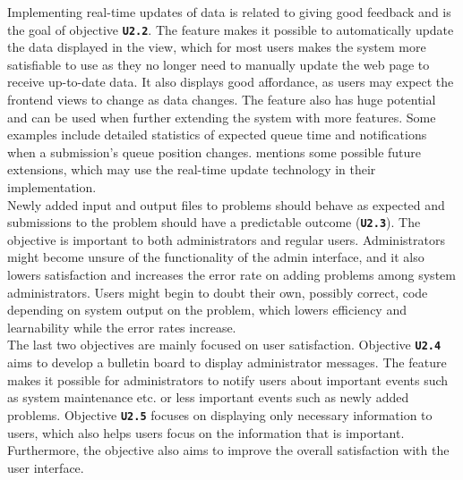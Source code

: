 Implementing real-time updates of data is related to giving good feedback and is the goal of objective \textbf{\texttt{U2.2}}. The feature makes it possible to automatically update the data displayed in the view, which for most users makes the system more satisfiable to use as they no longer need to manually update the web page to receive up-to-date data. It also displays good affordance, as users may expect the frontend views to change as data changes. The feature also has huge potential and can be used when further extending the system with more features. Some examples include detailed statistics of expected queue time and notifications when a submission's queue position changes.  mentions some possible future extensions, which may use the real-time update technology in their implementation. \\

Newly added input and output files to problems should behave as expected and submissions to the problem should have a predictable outcome (\textbf{\texttt{U2.3}}). The objective is important to both administrators and regular users. Administrators might become unsure of the functionality of the admin interface, and it also lowers satisfaction and increases the error rate on adding problems among system administrators. Users might begin to doubt their own, possibly correct, code depending on system output on the problem, which lowers efficiency and learnability while the error rates increase. \\

The last two objectives are mainly focused on user satisfaction. Objective \textbf{\texttt{U2.4}} aims to develop a bulletin board to display administrator messages. The feature makes it possible for administrators to notify users about important events such as system maintenance etc. or less important events such as newly added problems. Objective \textbf{\texttt{U2.5}} focuses on displaying only necessary information to users, which also helps users focus on the information that is important. Furthermore, the objective also aims to improve the overall satisfaction with the user interface.
